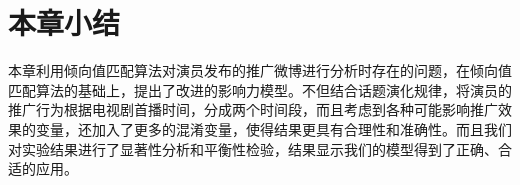 \section{本章小结}

本章利用倾向值匹配算法对演员发布的推广微博进行分析时存在的问题，在倾向值匹配算法的基础上，提出了改进的影响力模型。不但结合话题演化规律，将演员的推广行为根据电视剧首播时间，分成两个时间段，而且考虑到各种可能影响推广效果的变量，还加入了更多的混淆变量，使得结果更具有合理性和准确性。而且我们对实验结果进行了显著性分析和平衡性检验，结果显示我们的模型得到了正确、合适的应用。



































